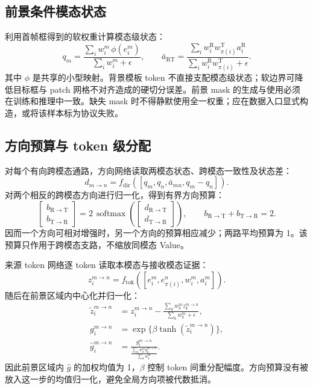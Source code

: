 \documentclass[journal]{IEEEtran}
\newcommand{\R}{\mathrm{R}}
\newcommand{\T}{\mathrm{T}}
\newcommand{\softmax}{\operatorname{softmax}}
\begin{document}
\subsection{前景条件模态状态}
利用首帧框得到的软权重计算模态级状态：
\begin{equation}
 q_m=\frac{\sum_i w_i^m\,\phi(e_i^m)}
           {\sum_i w_i^m+\epsilon},\qquad
 \bar a_{\R\T}=\frac{\sum_i w_i^\R w_{\pi(i)}^\T a_i^\R}
 {\sum_i w_i^\R w_{\pi(i)}^\T+\epsilon}.
\end{equation}
其中 $\phi$ 是共享的小型映射。背景模板 token 不直接支配模态级状态；软边界可降低目标框与 patch 网格不对齐造成的硬切分误差。前景 mask 的生成与使用必须在训练和推理中一致。缺失 mask 时不得静默使用全一权重；应在数据入口显式构造，或将该样本标为协议失败。

\subsection{方向预算与 token 级分配}
对每个有向跨模态通路，方向网络读取两模态状态、跨模态一致性及状态差：
\begin{equation}
 d_{m\rightarrow n}=f_{\mathrm{dir}}([q_m,q_n,\bar a_{mn},q_m-q_n]).
\end{equation}
对两个相反的跨模态方向进行归一化，得到有界方向预算：
\begin{equation}
 \begin{bmatrix}b_{\R\rightarrow\T}\\b_{\T\rightarrow\R}\end{bmatrix}
 =2\,\softmax\!\left(\begin{bmatrix}d_{\R\rightarrow\T}\\
 d_{\T\rightarrow\R}\end{bmatrix}\right),\qquad
 b_{\R\rightarrow\T}+b_{\T\rightarrow\R}=2.
\end{equation}
因而一个方向可相对增强时，另一个方向的预算相应减少；两路平均预算为 1。该预算只作用于跨模态支路，不缩放同模态 Value。

来源 token 网络逐 token 读取本模态与接收模态证据：
\begin{equation}
 z_i^{m\rightarrow n}=f_{\mathrm{tok}}([e_i^m,e_{\pi(i)}^n,w_i^m,a_i^m]).
\end{equation}
随后在前景区域内中心化并归一化：
\begin{align}
 \tilde z_i^{m\rightarrow n}&=z_i^{m\rightarrow n} -
 \frac{\sum_k w_k^m z_k^{m\rightarrow n}}{\sum_k w_k^m+\epsilon},\\
 g_i^{m\rightarrow n}&=\exp\{\beta\tanh(\tilde z_i^{m\rightarrow n})\},\\
 \hat g_i^{m\rightarrow n}&=\frac{g_i^{m\rightarrow n}}
 {\frac{\sum_k w_k^m g_k^{m\rightarrow n}}{\sum_k w_k^m}}.
\end{align}
因此前景区域内 $\hat g$ 的加权均值为 1，$\beta$ 控制 token 间重分配幅度。方向预算没有被放入这一步的均值归一化，避免全局方向项被代数抵消。
\end{document}
